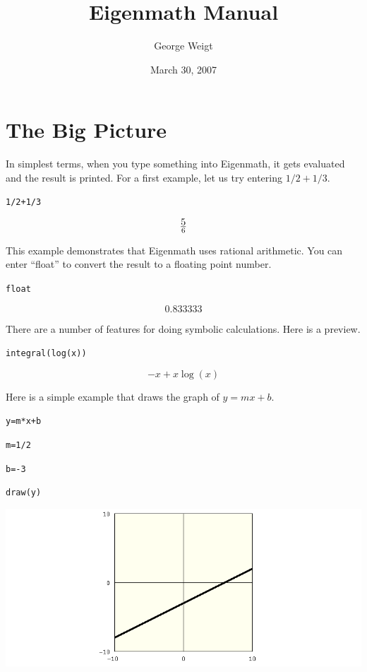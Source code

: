 \documentclass[12pt,openany]{report}
\title{Eigenmath Manual}
\author{George Weigt}
\date{March 30, 2007}
\begin{document}
\maketitle
\tableofcontents

\newpage

\chapter{The Big Picture}
In simplest terms, when you type something into Eigenmath,
it gets evaluated and the result is printed.
For a first example, let us try entering $1/2+1/3$.

\medskip
{\tt 1/2+1/3}

$$5\over6$$

\medskip
\noindent
This example demonstrates that Eigenmath uses rational arithmetic.
You can enter ``float'' to convert the result to a floating point number.

\medskip
{\tt float}

$$0.833333$$

\medskip
\noindent
There are a number of features for doing symbolic calculations.
Here is a preview.

\medskip
{\tt integral(log(x))}

$$-x+x\log(x)$$

\newpage

\noindent
Here is a simple example that draws the graph of $y=mx+b$.

\medskip
{\tt y=m*x+b}

{\tt m=1/2}

{\tt b=-3}

{\tt draw(y)}

\begin{center}
\item[]\includegraphics[scale=0.5]{1.png}
\end{center}

\newpage
\end{document}
